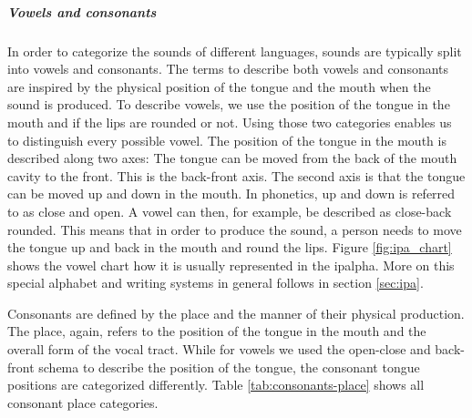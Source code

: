 \subparagraph{Vowels and consonants} In order to categorize the sounds of different languages, sounds are typically split into vowels and consonants. The terms to describe both vowels and consonants are inspired by the physical position of the tongue and the mouth when the sound is produced. To describe vowels, we use the position of the tongue in the mouth and if the lips are rounded or not. Using those two categories enables us to distinguish every possible vowel. The position of the tongue in the mouth is described along two axes: The tongue can be moved from the back of the mouth cavity to the front. This is the back-front axis. The second axis is that the tongue can be moved up and down in the mouth. In phonetics, up and down is referred to as close and open. A vowel can then, for example, be described as close-back rounded. This means that in order to produce the sound, a person needs to move the tongue up and back in the mouth and round the lips. Figure \ref{fig:ipa_chart} shows the vowel chart how it is usually represented in the \ac{ipalpha}. More on this special alphabet and writing systems in general follows in section \ref{sec:ipa}. 

Consonants are defined by the place and the manner of their physical production. The place, again, refers to the position of the tongue in the mouth and the overall form of the vocal tract. While for vowels we used the open-close and back-front schema to describe the position of the tongue, the consonant tongue positions are categorized differently. Table \ref{tab:consonants-place} shows all consonant place categories.


